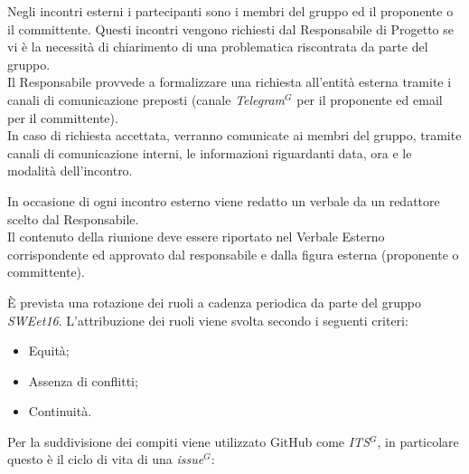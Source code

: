 
            Negli incontri esterni i partecipanti sono i membri del gruppo ed il proponente o il committente.
            Questi incontri vengono richiesti dal Responsabile di Progetto se vi è la necessità di chiarimento di una problematica riscontrata da parte del gruppo.     \\
            Il Responsabile provvede a formalizzare una richiesta all'entità esterna tramite i canali di comunicazione preposti (canale \emph{Telegram}$^{G}$ per il proponente ed email per il committente).\\

            In caso di richiesta accettata, verranno comunicate ai membri del gruppo, tramite canali di comunicazione interni, le informazioni riguardanti data, ora e le modalità dell'incontro.

            In occasione di ogni incontro esterno viene redatto un verbale da un redattore scelto dal Responsabile.  \\
            Il contenuto della riunione deve essere riportato nel Verbale Esterno corrispondente ed approvato dal responsabile e dalla figura esterna (proponente o committente).


        È prevista una rotazione dei ruoli a cadenza periodica da parte del gruppo \textit{SWEet16}.
        L'attribuzione dei ruoli viene svolta secondo i seguenti criteri:
        \begin{itemize}
            \item Equità;
            \item Assenza di conflitti;
            \item Continuità.
        \end{itemize}


        Per la suddivisione dei compiti viene utilizzato GitHub come \emph{ITS}$^{G}$, in particolare questo è il ciclo di vita di una \emph{issue}$^{G}$:

